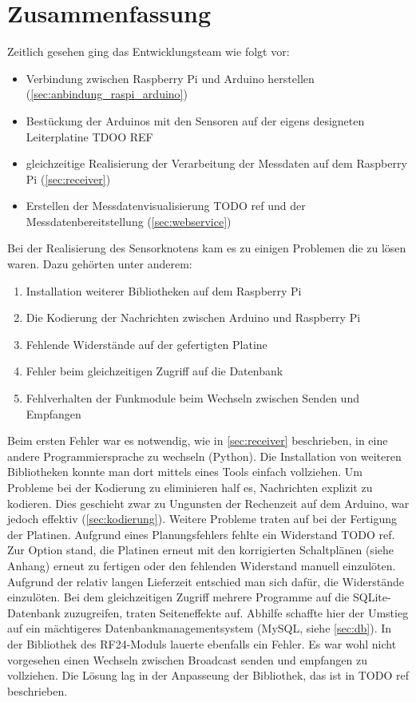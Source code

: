 \section{Zusammenfassung}
Zeitlich gesehen ging das Entwicklungsteam wie folgt vor:
\begin{itemize}
\item Verbindung zwischen Raspberry Pi und Arduino herstellen (\ref{sec:anbindung_raspi_arduino})
\item Bestückung der Arduinos mit den Sensoren auf der eigens designeten Leiterplatine TDOO REF
\item gleichzeitige Realisierung der Verarbeitung der Messdaten auf dem Raspberry Pi (\ref{sec:receiver})
\item Erstellen der Messdatenvisualisierung TODO ref und der Messdatenbereitstellung (\ref{sec:webservice}) 
\end{itemize}

Bei der Realisierung des Sensorknotens kam es zu einigen Problemen die zu lösen waren. Dazu gehörten unter anderem:
\begin{enumerate}
\item Installation weiterer Bibliotheken auf dem Raspberry Pi
\item Die Kodierung der Nachrichten zwischen Arduino und Raspberry Pi
\item Fehlende Widerstände auf der gefertigten Platine
\item Fehler beim gleichzeitigen Zugriff auf die Datenbank
\item Fehlverhalten der Funkmodule beim Wechseln zwischen Senden und Empfangen
\end{enumerate}

Beim ersten Fehler war es notwendig, wie in  \ref{sec:receiver} beschrieben, in eine andere Programmiersprache zu wechseln (Python). Die Installation von weiteren Bibliotheken konnte man dort mittels eines Tools einfach vollziehen. 
Um Probleme bei der Kodierung zu eliminieren half es, Nachrichten explizit zu kodieren. Dies geschieht zwar zu Ungunsten der Rechenzeit auf dem Arduino, war jedoch effektiv (\ref{sec:kodierung}). 
Weitere Probleme traten auf bei der Fertigung der Platinen. Aufgrund eines Planungsfehlers fehlte ein Widerstand TODO ref. Zur Option stand, die Platinen erneut mit den korrigierten Schaltplänen (siehe Anhang) erneut zu fertigen oder den fehlenden Widerstand manuell einzulöten. Aufgrund der relativ langen Lieferzeit entschied man sich dafür, die Widerstände einzulöten.
Bei dem gleichzeitigen Zugriff mehrere Programme auf die SQLite-Datenbank zuzugreifen, traten Seiteneffekte auf. Abhilfe schaffte hier der Umstieg auf ein mächtigeres Datenbankmanagementsystem (MySQL, siehe \ref{sec:db}).
In der Bibliothek des RF24-Moduls lauerte ebenfalls ein Fehler. Es war wohl nicht vorgesehen einen Wechseln zwischen Broadcast senden und empfangen zu vollziehen. Die Lösung lag in der Anpasseung der Bibliothek, das ist in TODO ref beschrieben.
